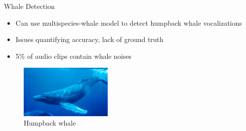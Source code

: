 \begin{frame}{Whale Detection}
    \begin{itemize}
        \item Can use multispecies-whale model to detect humpback whale vocalizations
        \item Issues quantifying accuracy, lack of ground truth
        \item 5\% of audio clips contain whale noises
    \end{itemize}
    \begin{figure}
        \centering
        \includegraphics[height=0.4\textheight,width=0.4\textwidth,keepaspectratio]{images/humpback_whale.jpg}
        \caption{Humpback whale}
    \end{figure}
\end{frame}

